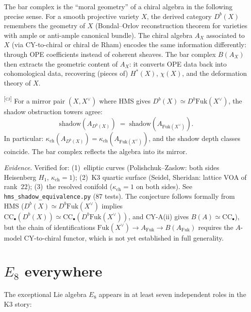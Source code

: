 \documentclass[11pt]{article}
\newcommand{\ClaimStatusConjectured}{\textsuperscript{\textsc{[cj]}}}
\begin{document}
The bar complex is the ``moral geometry'' of a chiral algebra in the following precise sense. For a smooth projective variety $X$, the derived category $D^b(X)$ remembers the geometry of $X$ (Bondal--Orlov reconstruction theorem for varieties with ample or anti-ample canonical bundle). The chiral algebra $A_X$ associated to $X$ (via CY-to-chiral or chiral de Rham) encodes the same information differently: through OPE coefficients instead of coherent sheaves. The bar complex $B(A_X)$ then extracts the geometric content of $A_X$: it converts OPE data back into cohomological data, recovering (pieces of) $H^*(X)$, $\chi(X)$, and the deformation theory of $X$.

\begin{conjecture}
\label{conj:hms-shadow-equivalence}
\ClaimStatusConjectured{}
For a mirror pair $(X, X^\vee)$ where HMS gives
$D^b(X) \simeq D^b\mathrm{Fuk}(X^\vee)$, the shadow obstruction
towers agree:
\[
 \mathrm{shadow}(A_{D^b(X)}) \;=\; \mathrm{shadow}(A_{\mathrm{Fuk}(X^\vee)}).
\]
In particular: $\kappa_{\mathrm{ch}}(A_{D^b(X)}) = \kappa_{\mathrm{ch}}(A_{\mathrm{Fuk}(X^\vee)})$,
and the shadow depth classes coincide.
The bar complex reflects the algebra into its mirror.
\end{conjecture}

\noindent\textit{Evidence.} Verified for: (1)~elliptic curves
(Polishchuk--Zaslow: both sides Heisenberg $H_1$, $\kappa_{\mathrm{ch}} = 1$);
(2)~K3 quartic surface (Seidel, Sheridan: lattice VOA of rank~$22$);
(3)~the resolved conifold ($\kappa_{\mathrm{ch}} = 1$ on both sides).
See \texttt{hms\_shadow\_equivalence.py} ($87$ tests).
The conjecture follows formally from HMS
($D^b(X) \simeq D^b\mathrm{Fuk}(X^\vee)$ implies
$\mathrm{CC}_\bullet(D^b(X)) \simeq \mathrm{CC}_\bullet(D^b\mathrm{Fuk}(X^\vee))$,
and CY-A(ii) gives $B(A) \simeq \mathrm{CC}_\bullet$), but the
chain of identifications $\mathrm{Fuk}(X^\vee) \to A_{\mathrm{Fuk}}
\to B(A_{\mathrm{Fuk}})$ requires the $A$-model CY-to-chiral functor,
which is not yet established in full generality.


\section{$E_8$ everywhere}
\label{sec:motivic-e8}

The exceptional Lie algebra $E_8$ appears in at least seven independent roles in the K3 story:
\end{document}
